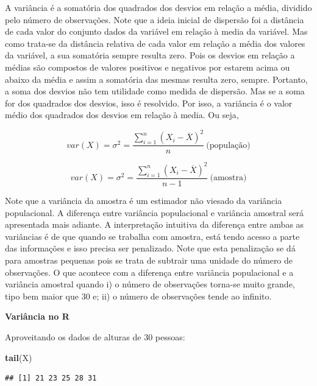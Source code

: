\documentclass[
]{book}
\newenvironment{Shaded}{\begin{snugshade}}{\end{snugshade}}
\newcommand{\KeywordTok}[1]{\textcolor[rgb]{0.13,0.29,0.53}{\textbf{#1}}}
\newcommand{\NormalTok}[1]{#1}
\begin{document}
A variância é a somatória dos quadrados dos desvios em relação a média, dividido pelo número de observações. Note que a ideia inicial de dispersão foi a distância de cada valor do conjunto dados da variável em relação à media da variável. Mas como trata-se da distância relativa de cada valor em relação a média dos valores da variável, a sua somatória sempre resulta zero. Pois os desvios em relação a médias são compostos de valores positivos e negativos por estarem acima ou abaixo da média e assim a somatória das mesmas resulta zero, sempre. Portanto, a soma dos desvios não tem utilidade como medida de dispersão. Mas se a soma for dos quadrados dos desvios, isso é resolvido. Por isso, a variância é o valor médio dos quadrados dos desvios em relação à media. Ou seja,

\begin{equation*}
  var(X) =\sigma^2 = \frac{\sum_{i=1}^{n}(X_i - \overline{X})^2}{n}~\text{(população)}
\end{equation*}

\begin{equation*}
  var(X) =\sigma^2 = \frac{\sum_{i=1}^{n}(X_i - \overline{X})^2}{n-1}~\text{(amostra)}
\end{equation*}

Note que a variância da amostra é um estimador não viesado da variância populacional. A diferença entre variância populacional e variância amostral será apresentada mais adiante. A interpretação intuitiva da diferença entre ambas as variâncias é de que quando se trabalha com amostra, está tendo acesso a parte das informações e isso precisa ser penalizado. Note que esta penalização se dá para amostras pequenas pois se trata de subtrair uma unidade do número de observações.
O que acontece com a diferença entre variância populacional e a variância amostral quando i) o número de observações torna-se muito grande, tipo bem maior que 30 e; ii) o número de observações tende ao infinito.

\textbf{Variância no R}

Aproveitando os dados de alturas de 30 pessoas:

\begin{Shaded}
\begin{Highlighting}[]
\KeywordTok{tail}\NormalTok{(X)}
\end{Highlighting}
\end{Shaded}

\begin{verbatim}
## [1] 21 23 25 28 31
\end{verbatim}
\end{document}
